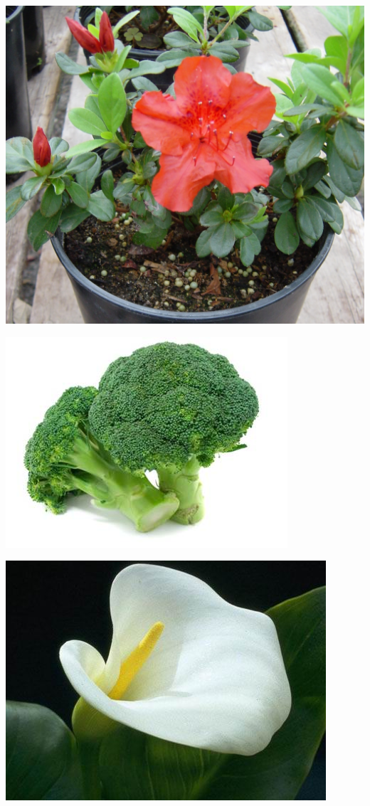 \documentclass{article}
\begin{document}
\begin{center}
\includegraphics[height=0.9\textheight, angle=90]{../Azalea.jpg}
\end{center}
\newpage

\begin{center}
\includegraphics[height=0.9\textheight, angle=90]{../Broccoli.jpg}
\end{center}
\newpage

\begin{center}
\includegraphics[height=0.9\textheight, angle=90]{../CallaLily.jpg}
\end{center}
\newpage
\end{document}

